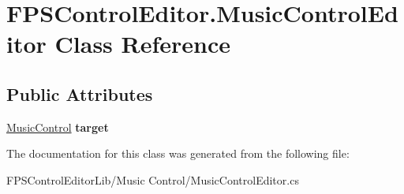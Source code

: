\hypertarget{class_f_p_s_control_editor_1_1_music_control_editor}{\section{F\-P\-S\-Control\-Editor.\-Music\-Control\-Editor Class Reference}
\label{class_f_p_s_control_editor_1_1_music_control_editor}
}
\subsection*{Public Attributes}
\begin{DoxyCompactItemize}
\item 
\hypertarget{class_f_p_s_control_editor_1_1_music_control_editor_ab0a47b13a8f4e009942efa18b6a9986a}{\hyperlink{class_f_p_s_control_1_1_music_control}{Music\-Control} {\bfseries target}}\label{class_f_p_s_control_editor_1_1_music_control_editor_ab0a47b13a8f4e009942efa18b6a9986a}

\end{DoxyCompactItemize}


The documentation for this class was generated from the following file\-:\begin{DoxyCompactItemize}
\item 
F\-P\-S\-Control\-Editor\-Lib/\-Music Control/Music\-Control\-Editor.\-cs\end{DoxyCompactItemize}

